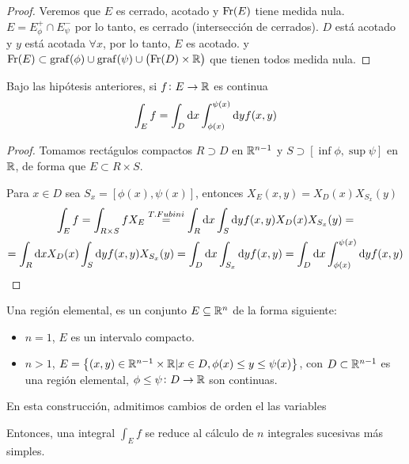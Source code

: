 \begin{proof}
    Veremos que $E$ es cerrado, acotado y $\operatorname{Fr}(E)$ tiene medida nula. $E = E^+_\phi
    \cap E^-_\psi$ por lo tanto, es cerrado (intersección de cerrados). $D$ está
    acotado y $y$ está acotada $\forall x$, por lo tanto, $E$ es acotado. y $\operatorname{Fr}(E)
    \subset \operatorname{graf}(\phi) \cup \operatorname{graf}(\psi) \cup \left( \operatorname{Fr}(D) \times \mathbb{R} \right)$ que
    tienen todos medida nula.
\end{proof}

\begin{prop}
    Bajo las hipótesis anteriores, si $f \colon E \to \mathbb{R}$ es continua
    \[
        \int_E f = \int_D \dif x \int^{\psi(x)}_{\phi(x)} \dif y f(x, y)
    \]
\end{prop}
\begin{proof}
    Tomamos rectágulos compactos $R \supset D$ en $\mathbb{R}^{n-1}$ y $S \supset [\inf\phi,
    \sup\psi]$ en $\mathbb{R}$, de forma que $E \subset R \times S$.

    Para $x \in D$ sea $S_x = [\phi(x), \psi(x)]$, entonces $X_E(x, y) =
    X_D(x)X_{S_x}(y)$
    \begin{gather*}
        \int_E f = \int_{R \times S} f X_E \stackrel{T. Fubini}{=}
        \int_R \dif x \int_S \dif y f(x, y) X_D(x) X_{S_x}(y) =\\= \int_R \dif x X_D(x) \int_S \dif y f(x,y) X_{S_x}(y) =
        \int_D \dif x \int_{S_x} \dif y f(x, y) = \int_D \dif x \int^{\psi(x)}_{\phi(x)} \dif y f(x,y)
    \end{gather*}
\end{proof}

\begin{defi}
    Una región elemental, es un conjunto $E \subseteq \mathbb{R}^n$ de la forma siguiente:
    \begin{itemize}
        \item $n = 1$, $E$ es un intervalo compacto.
        \item $n > 1$, $E = \left\{(x,y) \in \mathbb{R}^{n-1} \times \mathbb{R} \vert x \in D, \phi(x) \leq y \leq \psi(x)\right\}$, con $D \subset \mathbb{R}^{n-1}$
            es una región elemental, $\phi \leq \psi \colon D \to \mathbb{R}$ son continuas.
    \end{itemize}

    En esta construcción, admitimos cambios de orden el las variables
\end{defi}

\begin{obs*}
    Entonces, una integral $\int_E f$ se reduce al cálculo de $n$ integrales sucesivas más simples.
\end{obs*}

